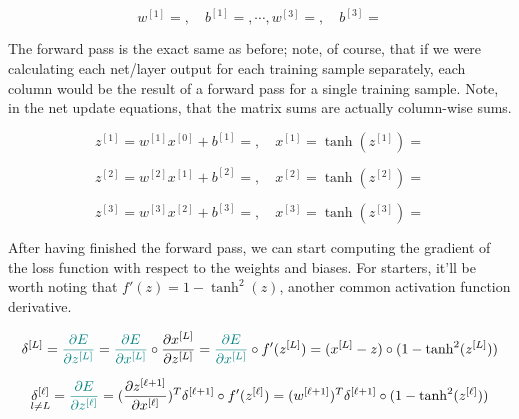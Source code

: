 \documentclass[12pt]{article}
\begin{document}
\begin{enumerate}[leftmargin=\labelsep]
  \begin{equation*}
    w^{[1]} = , \quad b^{[1]} = , \cdots,
    w^{[3]} = , \quad b^{[3]} = 
  \end{equation*}

  The forward pass is the exact same as before; note, of course, that if we
  were calculating each net/layer output for each training sample separately,
  each column would be the result of a forward pass for a single training
  sample. Note, in the net update equations, that the matrix sums are
  actually column-wise sums.

  \begin{equation*}
    z^{[1]} = w^{[1]} x^{[0]} + b^{[1]} = , \quad
    x^{[1]} = \tanh(z^{[1]}) = 
  \end{equation*}

  \begin{equation*}
    z^{[2]} = w^{[2]} x^{[1]} + b^{[2]} = , \quad
    x^{[2]} = \tanh(z^{[2]}) = 
  \end{equation*}

  \begin{equation*}
    z^{[3]} = w^{[3]} x^{[2]} + b^{[3]} = , \quad
    x^{[3]} = \tanh(z^{[3]}) = 
  \end{equation*}

  After having finished the forward pass, we can start computing the gradient
  of the loss function with respect to the weights and biases. For starters,
  it'll be worth noting that $f'(z) = 1 - \tanh^2(z)$, another common activation
  function derivative.

  \begin{equation*}
    \delta^{[L]} = \textcolor{teal}{\frac{\partial E}{\partial z^{[L]}}}
    = \textcolor{teal}{\frac{\partial E}{\partial x^{[L]}}} \circ \frac{\partial x^{[L]}}{\partial z^{[L]}}
    = \textcolor{teal}{\frac{\partial E}{\partial x^{[L]}}} \circ f'(z^{[L]})
    = (x^{[L]} - z) \circ (1 - \tanh^2(z^{[L]}))
  \end{equation*}

  \begin{equation*}
    \underset{l \neq L}{\delta^{[\ell]}} = \textcolor{teal}{\frac{\partial E}{\partial z^{[\ell]}}}
    = (\frac{\partial z^{[\ell+1]}}{\partial x^{[\ell]}})^T \delta^{[\ell+1]} \circ f'(z^{[\ell]})
    = (w^{[\ell+1]})^T \delta^{[\ell+1]} \circ (1 - \tanh^2(z^{[\ell]}))
  \end{equation*}


\end{enumerate}
\end{document}
